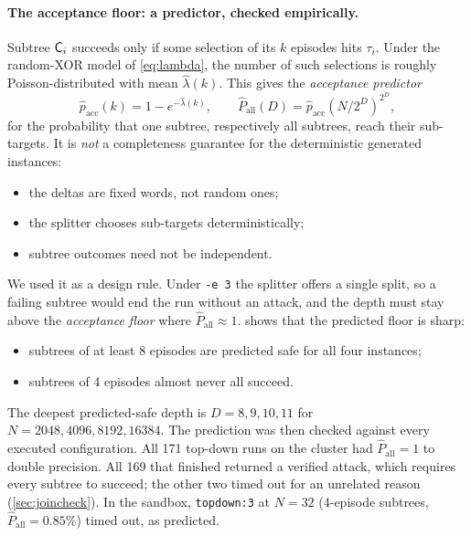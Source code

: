 \documentclass[11pt,a4paper]{article}
\newcommand{\dfam}[1]{\texttt{#1}}
\newcommand{\opt}[1]{\texttt{#1}}
\newcommand{\pacc}{\widehat{p}_{\mathrm{acc}}}
\newcommand{\Pall}{\widehat{P}_{\mathrm{all}}}
\begin{document}
\paragraph{The acceptance floor: a predictor, checked empirically.}
Subtree $\mathsf{C}_i$ succeeds only if some selection of its $k$ episodes hits $\tau_i$. Under the
random-XOR model of \cref{eq:lambda}, the number of such selections is roughly
Poisson-distributed with mean $\widehat{\lambda}(k)$. This gives the \emph{acceptance
predictor}
\begin{equation}
\pacc(k) = 1-e^{-\widehat{\lambda}(k)}, \qquad \Pall(D) = \pacc\!\left(N/2^D\right)^{2^D},
\label{eq:pacc}
\end{equation}
for the probability that one subtree, respectively all subtrees, reach their sub-targets.
It is \emph{not} a completeness guarantee for the deterministic generated instances:
\begin{itemize}
\item the deltas are fixed words, not random ones;
\item the splitter chooses sub-targets deterministically;
\item subtree outcomes need not be independent.
\end{itemize}
We used it as a design rule. Under \opt{-e 3} the splitter offers a single split, so a
failing subtree would end the run without an attack, and the depth must stay above the
\emph{acceptance floor} where $\Pall\approx 1$.  shows that the
predicted floor is sharp:
\begin{itemize}
\item subtrees of at least 8 episodes are predicted safe for all four instances;
\item subtrees of 4 episodes almost never all succeed.
\end{itemize}
The deepest predicted-safe depth is $D=8,9,10,11$ for $N=2048,4096,8192,16384$. The
prediction was then checked against every executed configuration. All 171 top-down runs on the
cluster had $\Pall=1$ to double precision. All 169 that finished returned a verified attack,
which requires every subtree to succeed; the other two timed out for an unrelated reason
(\cref{sec:joincheck}). In the sandbox, \dfam{topdown:3} at $N=32$ (4-episode subtrees,
$\Pall=0.85\%$) timed out, as predicted.
\end{document}
